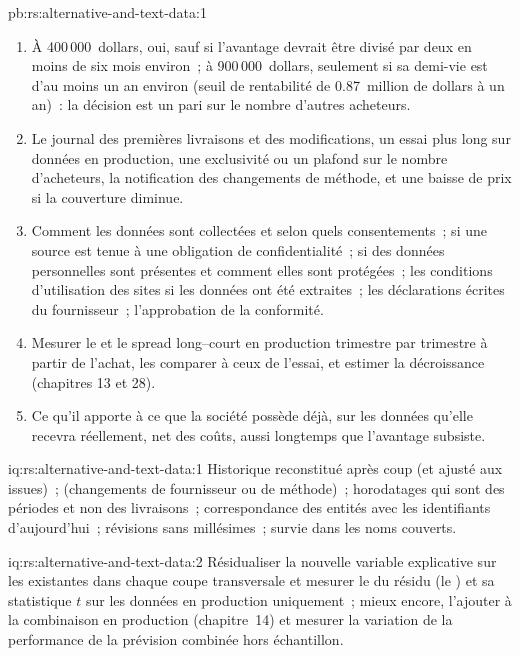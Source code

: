 \begin{solution}{pb:rs:alternative-and-text-data:1}
\begin{enumerate}
de deux ans, le panel de cartes vaut 1.35~million de dollars par an sur trois ans, soit un quart de ce que son historique reconstitué implique (5.06~millions de dollars)~; à
une demi-vie de six mois, 0.43~million de dollars.
\item À 400\,000~dollars, oui, sauf si l'avantage devrait être divisé par deux en moins de six mois environ~; à 900\,000~dollars, seulement si sa demi-vie est d'au moins un an environ
(seuil de rentabilité de 0.87~million de dollars à un an)~: la décision est un pari sur le nombre d'autres acheteurs.
\item Le journal des premières livraisons et des modifications, un essai plus long sur données en production, une exclusivité ou un plafond sur le nombre d'acheteurs, la notification
des changements de méthode, et une baisse de prix si la couverture diminue.
\item Comment les données sont collectées et selon quels consentements~; si une source est tenue à une obligation de confidentialité~; si des données personnelles sont présentes
et comment elles sont protégées~; les conditions d'utilisation des sites si les données ont été extraites~; les déclarations écrites du fournisseur~; l'approbation de la conformité.
\item Mesurer le  et le spread long--court en production trimestre par trimestre à partir de l'achat, les comparer à ceux de l'essai, et estimer la décroissance
(chapitres 13 et 28).
\item Ce qu'il apporte à ce que la société possède déjà, sur les données qu'elle recevra réellement, net des coûts, aussi longtemps que l'avantage subsiste.
\end{enumerate}
\end{solution}

\begin{solution}{iq:rs:alternative-and-text-data:1}
Historique reconstitué après coup (et ajusté aux issues)~;  (changements de fournisseur ou de méthode)~; horodatages qui sont des périodes et non
des livraisons~; correspondance des entités avec les identifiants d'aujourd'hui~; révisions sans millésimes~; survie dans les noms couverts.
\end{solution}

\begin{solution}{iq:rs:alternative-and-text-data:2}
Résidualiser la nouvelle variable explicative sur les existantes dans chaque coupe transversale et mesurer le  du résidu (le ) et sa statistique $t$
sur les données en production uniquement~; mieux encore, l'ajouter à la combinaison en production (chapitre~14) et mesurer la variation de la performance de la prévision
combinée hors échantillon.
\end{solution}

